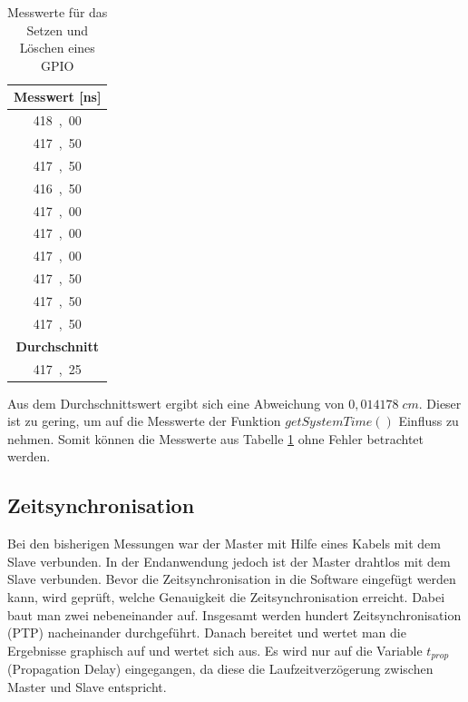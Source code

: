 \begin{table}[H]
\centering
\caption{Messwerte für das Setzen und Löschen eines GPIO}
\label{table:modul_E2}
\begin{tabular}{|c|}
\hline
\textbf{Messwert [\si{ns}]} \\ \hline
\si{418,00}	 \\ \hline
\si{417,50}	 \\ \hline
\si{417,50}	 \\ \hline
\si{416,50}	 \\ \hline
\si{417,00}	 \\ \hline
\si{417,00}	 \\ \hline
\si{417,00}	 \\ \hline
\si{417,50}	 \\ \hline
\si{417,50}	 \\ \hline
\si{417,50}	 \\ \hline
\textbf{Durchschnitt}      \\ \hline
\si{417,25}	 \\ \hline
\end{tabular}
\end{table}

Aus dem Durchschnittswert ergibt sich eine Abweichung von $0,014178 \; cm$. Dieser ist zu gering, um auf die Messwerte der Funktion $getSystemTime()$ Einfluss zu nehmen. Somit können die Messwerte aus Tabelle \ref{table:modul_E2} ohne Fehler betrachtet werden.


\subsection{Zeitsynchronisation}
Bei den bisherigen Messungen war der Master mit Hilfe eines Kabels mit dem Slave verbunden. In der Endanwendung jedoch ist der Master drahtlos mit dem Slave verbunden. Bevor die Zeitsynchronisation in die Software eingefügt werden kann, wird geprüft, welche Genauigkeit die Zeitsynchronisation erreicht. Dabei baut man zwei \board \platz nebeneinander auf. Insgesamt werden hundert Zeitsynchronisation (PTP) nacheinander durchgeführt. Danach bereitet und wertet man die Ergebnisse graphisch auf und wertet sich aus. Es wird nur auf die Variable $t_{prop}$ (Propagation Delay) eingegangen, da diese die Laufzeitverzögerung zwischen Master und Slave entspricht.
 
